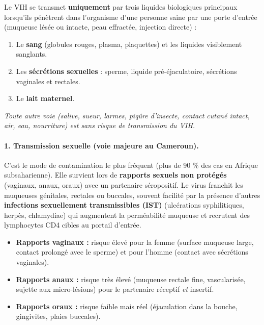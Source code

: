 \documentclass[11pt]{article}
\begin{document}
\begin{propriete}
Le VIH se transmet \textbf{uniquement} par trois liquides biologiques principaux lorsqu'ils pénètrent dans l'organisme d'une personne saine par une porte d'entrée (muqueuse lésée ou intacte, peau effractée, injection directe) :
\begin{enumerate}
    \item Le \textbf{sang} (globules rouges, plasma, plaquettes) et les liquides visiblement sanglants.
    \item Les \textbf{sécrétions sexuelles} : sperme, liquide pré-éjaculatoire, sécrétions vaginales et rectales.
    \item Le \textbf{lait maternel}.
\end{enumerate}
\emph{Toute autre voie (salive, sueur, larmes, piqûre d'insecte, contact cutané intact, air, eau, nourriture) est sans risque de transmission du VIH.}
\end{propriete}

\paragraph{1. Transmission sexuelle (voie majeure au Cameroun).}
C'est le mode de contamination le plus fréquent (plus de 90 \% des cas en Afrique subsaharienne). Elle survient lors de \textbf{rapports sexuels non protégés} (vaginaux, anaux, oraux) avec un partenaire séropositif. Le virus franchit les muqueuses génitales, rectales ou buccales, souvent facilité par la présence d'autres \textbf{infections sexuellement transmissibles (IST)} (ulcérations syphilitiques, herpès, chlamydiae) qui augmentent la perméabilité muqueuse et recrutent des lymphocytes CD4 cibles au portail d'entrée.
\begin{itemize}
    \item \textbf{Rapports vaginaux :} risque élevé pour la femme (surface muqueuse large, contact prolongé avec le sperme) et pour l'homme (contact avec sécrétions vaginales).
    \item \textbf{Rapports anaux :} risque très élevé (muqueuse rectale fine, vascularisée, sujette aux micro-lésions) pour le partenaire réceptif \emph{et} insertif.
    \item \textbf{Rapports oraux :} risque faible mais réel (éjaculation dans la bouche, gingivites, plaies buccales).
\end{itemize}
\end{document}
